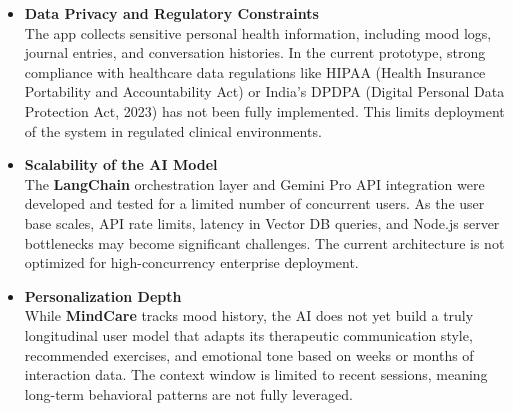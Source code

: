 \documentclass[a4paper,12pt]{report}
\begin{document}
\begin{itemize}
    \item \textbf{Data Privacy and Regulatory Constraints}\\
    The app collects sensitive personal health information, including mood logs, journal entries, and conversation histories. In the current prototype, strong compliance with healthcare data regulations like HIPAA (Health Insurance Portability and Accountability Act) or India's DPDPA (Digital Personal Data Protection Act, 2023) has not been fully implemented. This limits deployment of the system in regulated clinical environments.
    
    \item \textbf{Scalability of the AI Model}\\
    The \textbf{LangChain} orchestration layer and Gemini Pro API integration were developed and tested for a limited number of concurrent users. As the user base scales, API rate limits, latency in Vector DB queries, and Node.js server bottlenecks may become significant challenges. The current architecture is not optimized for high-concurrency enterprise deployment.
    
    \item \textbf{Personalization Depth}\\
    While \textbf{MindCare} tracks mood history, the AI does not yet build a truly longitudinal user model that adapts its therapeutic communication style, recommended exercises, and emotional tone based on weeks or months of interaction data. The context window is limited to recent sessions, meaning long-term behavioral patterns are not fully leveraged.
\end{itemize}
\end{document}
